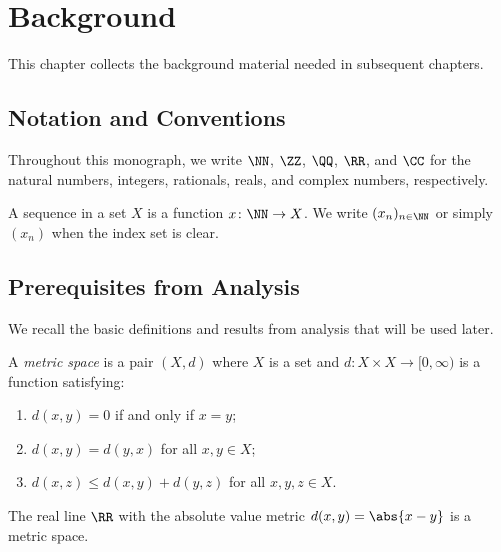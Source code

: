 
\chapter{Background}\label{cha:background}

This chapter collects the background material needed in subsequent chapters.

\section{Notation and Conventions}\label{sec:notation}

Throughout this monograph, we write $\NN$, $\ZZ$, $\QQ$, $\RR$, and $\CC$
for the natural numbers, integers, rationals, reals, and complex numbers,
respectively.

\begin{notation}\label{notn:sequences}
  A sequence in a set $X$ is a function $x \colon \NN \to X$.
  We write $(x_n)_{n \in \NN}$ or simply $(x_n)$ when the index set is clear.
\end{notation}

\section{Prerequisites from Analysis}\label{sec:prerequisites-analysis}

We recall the basic definitions and results from analysis that will be used later.

\begin{definition}\label{def:metric-space}
  A \emph{metric space} is a pair $(X, d)$ where $X$ is a set and
  $d \colon X \times X \to [0, \infty)$ is a function satisfying:
  \begin{enumerate}
  \item
    $d(x, y) = 0$ if and only if $x = y$;
  \item
    $d(x, y) = d(y, x)$ for all $x, y \in X$;
  \item
    $d(x, z) \le d(x, y) + d(y, z)$ for all $x, y, z \in X$.
  \end{enumerate}
\end{definition}

\begin{example}\label{exa:euclidean-metric}
  The real line $\RR$ with the absolute value metric $d(x, y) = \abs{x - y}$
  is a metric space.
\end{example}

